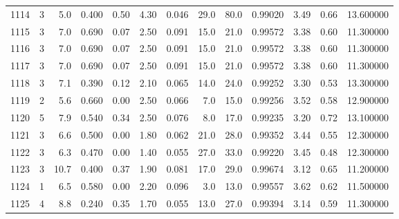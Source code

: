 \begin{tabular}{lrrrrrrrrrrrr}
1114 &        3 &            5.0 &             0.400 &         0.50 &            4.30 &      0.046 &                 29.0 &                  80.0 &  0.99020 &  3.49 &       0.66 &  13.600000 \\
1115 &        3 &            7.0 &             0.690 &         0.07 &            2.50 &      0.091 &                 15.0 &                  21.0 &  0.99572 &  3.38 &       0.60 &  11.300000 \\
1116 &        3 &            7.0 &             0.690 &         0.07 &            2.50 &      0.091 &                 15.0 &                  21.0 &  0.99572 &  3.38 &       0.60 &  11.300000 \\
1117 &        3 &            7.0 &             0.690 &         0.07 &            2.50 &      0.091 &                 15.0 &                  21.0 &  0.99572 &  3.38 &       0.60 &  11.300000 \\
1118 &        3 &            7.1 &             0.390 &         0.12 &            2.10 &      0.065 &                 14.0 &                  24.0 &  0.99252 &  3.30 &       0.53 &  13.300000 \\
1119 &        2 &            5.6 &             0.660 &         0.00 &            2.50 &      0.066 &                  7.0 &                  15.0 &  0.99256 &  3.52 &       0.58 &  12.900000 \\
1120 &        5 &            7.9 &             0.540 &         0.34 &            2.50 &      0.076 &                  8.0 &                  17.0 &  0.99235 &  3.20 &       0.72 &  13.100000 \\
1121 &        3 &            6.6 &             0.500 &         0.00 &            1.80 &      0.062 &                 21.0 &                  28.0 &  0.99352 &  3.44 &       0.55 &  12.300000 \\
1122 &        3 &            6.3 &             0.470 &         0.00 &            1.40 &      0.055 &                 27.0 &                  33.0 &  0.99220 &  3.45 &       0.48 &  12.300000 \\
1123 &        3 &           10.7 &             0.400 &         0.37 &            1.90 &      0.081 &                 17.0 &                  29.0 &  0.99674 &  3.12 &       0.65 &  11.200000 \\
1124 &        1 &            6.5 &             0.580 &         0.00 &            2.20 &      0.096 &                  3.0 &                  13.0 &  0.99557 &  3.62 &       0.62 &  11.500000 \\
1125 &        4 &            8.8 &             0.240 &         0.35 &            1.70 &      0.055 &                 13.0 &                  27.0 &  0.99394 &  3.14 &       0.59 &  11.300000 \\

\end{tabular}
